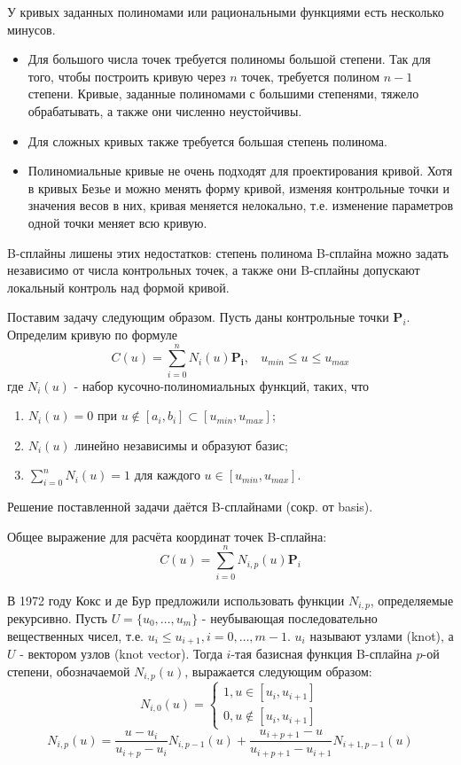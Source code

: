 \documentclass{bmstu}
\begin{document}
У кривых заданных полиномами или рациональными функциями есть несколько минусов.
\begin{itemize}
    \item Для большого числа точек требуется полиномы большой степени. Так для того, чтобы построить кривую через $n$ точек, требуется полином $n-1$ степени. Кривые, заданные полиномами с большими степенями, тяжело обрабатывать, а также они численно неустойчивы.
    \item Для сложных кривых также требуется большая степень полинома.
    \item Полиномиальные кривые не очень подходят для проектирования кривой. Хотя в кривых Безье и можно менять форму кривой, изменяя контрольные точки и  значения весов в них, кривая меняется нелокально, т.е. изменение параметров одной точки меняет всю кривую.
\end{itemize}

B-сплайны лишены этих недостатков: степень полинома B-сплайна можно задать независимо от числа контрольных точек, а также они B-сплайны допускают локальный контроль над формой кривой.

Поставим задачу следующим образом. Пусть даны контрольные точки $\mathbf{P}_i$. Определим кривую по формуле
\begin{equation}
    C(u) = \sum\limits_{i=0}^{n}N_i(u)\mathbf{P_i},~~~~u_{min}\le u \le u_{max}
\end{equation}
где $N_i(u)$ - набор кусочно-полиномиальных функций, таких, что
\begin{enumerate}
    \item $N_i(u) = 0$ при $u\notin[a_i, b_i]\subset[u_{min}, u_{max}]$;
    \item $N_i(u)$ линейно независимы и образуют базис;
    \item $\sum\limits_{i=0}^nN_i(u) = 1$ для каждого $u\in[u_{min}, u_{max}]$.
\end{enumerate}

Решение поставленной задачи даётся B-сплайнами (сокр. от basis).

Общее выражение для расчёта координат точек B-сплайна:
\begin{equation}
    C(u) = \sum\limits_{i=0}^nN_{i,p}(u)\mathbf{P}_i
\end{equation}

В 1972 году Кокс и де Бур предложили использовать функции $N_{i, p}$, определяемые рекурсивно. Пусть $U=\{u_0,\dots,u_m\}$ - неубывающая последовательно  вещественных чисел, т.е. $u_i\le u_{i+1}, i=0,\dots,m-1$. $u_i$ называют узлами (knot), а $U$ - вектором узлов (knot vector). Тогда $i$-тая базисная функция B-сплайна $p$-ой степени, обозначаемой $N_{i,p}(u)$, выражается следующим образом:
\begin{equation}
    N_{i, 0}(u) = \begin{cases}
        1, u\in[u_{i}, u_{i+1}] \\
        0, u\notin[u_{i}, u_{i+1}]
    \end{cases}
\end{equation}
\begin{equation}
    N_{i, p}(u) = \frac{u-u_i}{u_{i+p}-u_i}N_{i, p-1}(u)+\frac{u_{i+p+1}-u}{u_{i+p+1}-u_{i+1}}N_{i+1, p-1}(u)
\end{equation}
\end{document}
